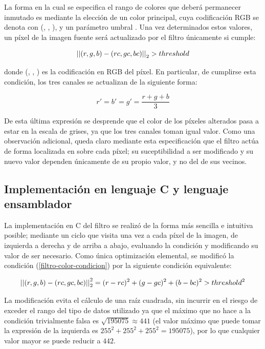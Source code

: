 La forma en la cual se especifica el rango de colores que deberá permanecer inmutado es mediante la elección de un color principal, cuya codificación RGB se denota con (, , ), y un parámetro umbral . Una vez determinados estos valores, un píxel de la imagen fuente será actualizado por el filtro únicamente si cumple:


\begin{equation} \label{filtro-color-condicion}
\left|\left|(r, g, b) - (rc, gc, bc)\right|\right|_2 > threshold 
\end{equation}

donde (, , ) es la codificación en RGB del píxel. En particular, de cumplirse esta condición, los tres canales se actualizan de la siguiente forma:

$$ r' = b' = g' = \frac{r + g + b}{3} $$

De esta última expresión se desprende que el color de los píxeles alterados pasa a estar en la escala de grises, ya que los tres canales toman igual valor. Como una observación adicional, queda claro mediante esta especificación que el filtro actúa de forma localizada en sobre cada píxel; su suceptibilidad a ser modificado y su nuevo valor dependen únicamente de su propio valor, y no del de sus vecinos.

\subsection{Implementación en lenguaje C y lenguaje ensamblador}

La implementación en C del filtro se realizó de la forma más sencilla e intuitiva posible; mediante un ciclo que visita una vez a cada píxel de la imagen, de izquierda a derecha y de arriba a abajo, evaluando la condición y modificando su valor de ser necesario. Como única optimización elemental, se modificó la condición (\ref{filtro-color-condicion}) por la siguiente condición equivalente:

$$\left|\left|(r, g, b) - (rc, gc, bc)\right|\right|_2^2 = (r - rc)^2 + (g - gc)^2 + (b - bc)^2 > threshold^2$$

La modificación evita el cálculo de una raíz cuadrada, sin incurrir en el riesgo de exceder el rango del tipo de datos utilizado ya que el máximo  que no hace a la condición trivialmente falsa es $\sqrt{195075} \approx 441$ (el valor máximo que puede tomar la expresión de la izquierda es $255^2 + 255^2 + 255^2 = 195075$), por lo que cualquier valor mayor se puede reducir a $442$.

